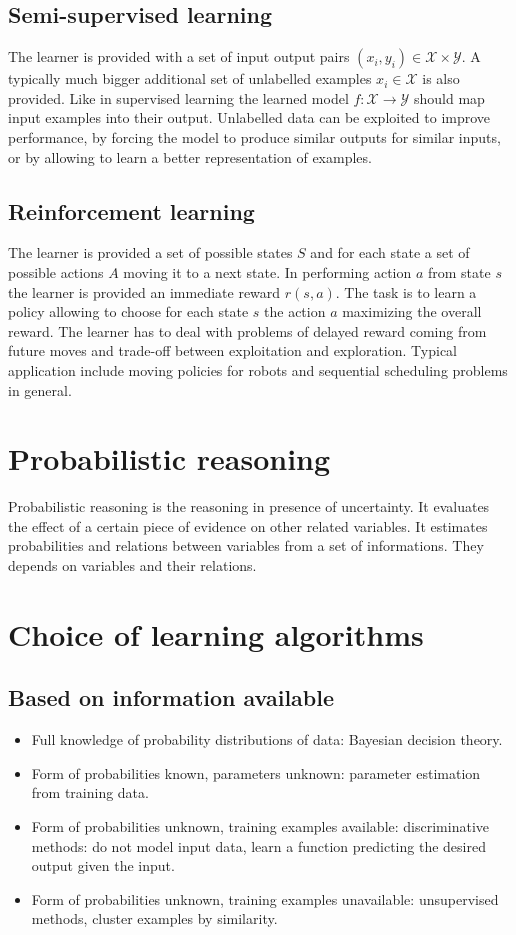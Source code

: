 	\subsection{Semi-supervised learning}
	The learner is provided with a set of input output pairs $(x_i, y_i)\in \mathcal{X}\times \mathcal{Y}$.
	A typically much bigger additional set of unlabelled examples $x_i\in \mathcal{X}$ is also provided.
	Like in supervised learning the learned model $f:\mathcal{X}\rightarrow \mathcal{Y}$ should map input examples into their output.
	Unlabelled data can be exploited to improve performance, by forcing the model to produce similar outputs for similar inputs, or by allowing to learn a better representation of examples.

	\subsection{Reinforcement learning}
	The learner is provided a set of possible states $S$ and for each state a set of possible actions $A$ moving it to a next state.
	In performing action $a$ from state $s$ the learner is provided an immediate reward $r(s,a)$.
	The task is to learn a policy allowing to choose for each state $s$ the action $a$ maximizing the overall reward.
	The learner has to deal with problems of delayed reward coming from future moves and trade-off between exploitation and exploration.
	Typical application include moving policies for robots and sequential scheduling problems in general.

\section{Probabilistic reasoning}
Probabilistic reasoning is the reasoning in presence of uncertainty.
It evaluates the effect of a certain piece of evidence on other related variables.
It estimates probabilities and relations between variables from a set of informations.
They depends on variables and their relations.

\section{Choice of learning algorithms}

	\subsection{Based on information available}
	\begin{itemize}
		\item Full knowledge of probability distributions of data: Bayesian decision theory.
		\item Form of probabilities known, parameters unknown: parameter estimation from training data.
		\item Form of probabilities unknown, training examples available: discriminative methods: do not model input data, learn a function predicting the desired output given the input.
		\item Form of probabilities unknown, training examples unavailable: unsupervised methods, cluster examples by similarity.
	\end{itemize}
